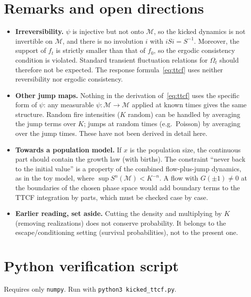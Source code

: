 \documentclass[11pt,a4paper]{article}
\theoremstyle{remark}
\newcommand{\M}{\mathcal{M}}
\begin{document}
\section{Remarks and open directions}
\begin{itemize}
\item \textbf{Irreversibility.} $\psi$ is injective but not onto $\M$, so the
  kicked dynamics is not invertible on $\M$, and there is no involution $i$
  with $iSi=S^{-1}$. Moreover, the support of $f_t$ is strictly smaller than
  that of $f_0$, so the ergodic consistency condition is violated. Standard
  transient fluctuation relations for $\Omega_t$ should therefore not be
  expected. The response formula~\eqref{eq:ttcf} uses neither reversibility
  nor ergodic consistency.
\item \textbf{Other jump maps.} Nothing in the derivation of~\eqref{eq:ttcf}
  uses the specific form of $\psi$: any measurable $\psi:\M\to\M$ applied at
  known times gives the same structure. Random fire intensities ($K$ random)
  can be handled by averaging the jump terms over $K$; jumps at random times
  (e.g.\ Poisson) by averaging over the jump times. These have not been
  derived in detail here.
\item \textbf{Towards a population model.} If $x$ is the population size,
  the continuous part should contain the growth law (with births). The
  constraint ``never back to the initial value'' is a property of the
  combined flow-plus-jump dynamics, as in the toy model, where
  $\sup S^n(\M)<K^{-n}$. A flow with $G(\pm1)\neq0$ at the boundaries of the
  chosen phase space would add boundary terms to the TTCF integration by
  parts, which must be checked case by case.
\item \textbf{Earlier reading, set aside.} Cutting the density and
  multiplying by $K$ (removing realizations) does not conserve probability.
  It belongs to the escape/conditioning setting (survival probabilities), not
  to the present one.
\end{itemize}

\appendix
\section{Python verification script}\label{app:code}
Requires only \texttt{numpy}. Run with \texttt{python3 kicked\_ttcf.py}.

\end{document}
